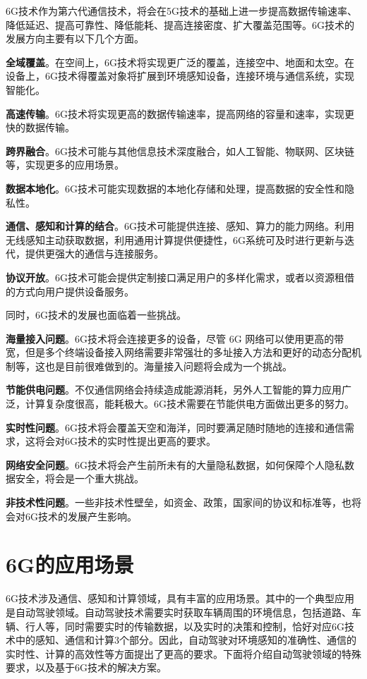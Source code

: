 \documentclass{article}
\begin{document}
6G技术作为第六代通信技术，将会在5G技术的基础上进一步提高数据传输速率、降低延迟、提高可靠性、降低能耗、提高连接密度、扩大覆盖范围等。6G技术的发展方向主要有以下几个方面。

\textbf{全域覆盖}。在空间上，6G技术将实现更广泛的覆盖，连接空中、地面和太空。在设备上，6G技术得覆盖对象将扩展到环境感知设备，连接环境与通信系统，实现智能化。

\textbf{高速传输}。6G技术将实现更高的数据传输速率，提高网络的容量和速率，实现更快的数据传输。

\textbf{跨界融合}。6G技术可能与其他信息技术深度融合，如人工智能、物联网、区块链等，实现更多的应用场景。

\textbf{数据本地化}。6G技术可能实现数据的本地化存储和处理，提高数据的安全性和隐私性。

\textbf{通信、感知和计算的结合}。6G技术可能提供连接、感知、算力的能力网络。利用无线感知主动获取数据，利用通用计算提供便捷性，6G系统可及时进行更新与迭代，提供更强大的通信与连接服务。

\textbf{协议开放}。6G技术可能会提供定制接口满足用户的多样化需求，或者以资源租借的方式向用户提供设备服务。

同时，6G技术的发展也面临着一些挑战。

\textbf{海量接入问题}。6G技术将会连接更多的设备，尽管 6G 网络可以使用更高的带宽，但是多个终端设备接入网络需要非常强壮的多址接入方法和更好的动态分配机制等，这也是目前很难做到的。海量接入问题将会成为一个挑战。

\textbf{节能供电问题}\cite{mao2021ai}。不仅通信网络会持续造成能源消耗，另外人工智能的算力应用广泛，计算复杂度很高，能耗极大。6G技术需要在节能供电方面做出更多的努力。

\textbf{实时性问题}\cite{cao2020delay}。6G技术将会覆盖天空和海洋，同时要满足随时随地的连接和通信需求，这将会对6G技术的实时性提出更高的要求。

\textbf{网络安全问题}\cite{nguyen2021security}。6G技术将会产生前所未有的大量隐私数据，如何保障个人隐私数据安全，将会是一个重大挑战。

\textbf{非技术性问题}。一些非技术性壁垒，如资金、政策，国家间的协议和标准等，也将会对6G技术的发展产生影响。

\section{6G的应用场景}

6G技术涉及通信、感知和计算领域，具有丰富的应用场景。其中的一个典型应用是自动驾驶领域\cite{chen2020deep,yang2021edge}。自动驾驶技术需要实时获取车辆周围的环境信息，包括道路、车辆、行人等，同时需要实时的传输数据，以及实时的决策和控制，恰好对应6G技术中的感知、通信和计算3个部分。因此，自动驾驶对环境感知的准确性、通信的实时性、计算的高效性等方面提出了更高的要求。下面将介绍自动驾驶领域的特殊要求，以及基于6G技术的解决方案。
\end{document}
